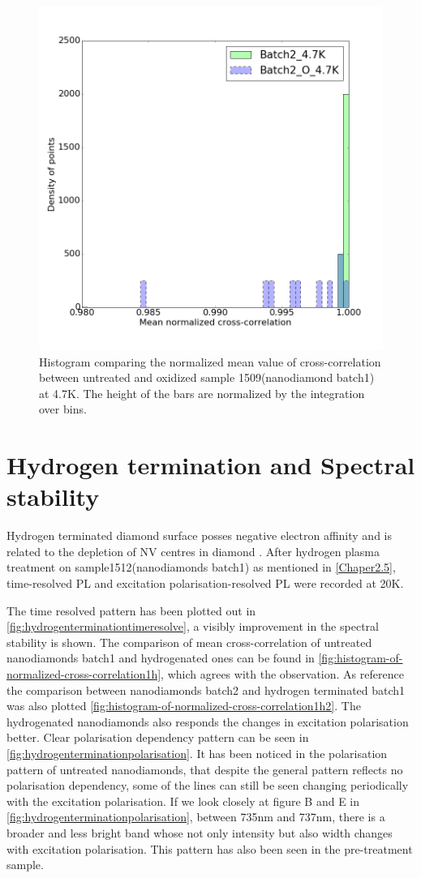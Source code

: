 \begin{figure}[h]
	\centering
	\includegraphics[width=0.7\linewidth]{"Figures/pic/Histogram of normalized cross-correlation_2_o"}
	\caption{Histogram comparing the normalized mean value of cross-correlation between untreated and oxidized sample 1509(nanodiamond batch1) at 4.7K. The height of the bars are normalized by the integration over bins. }
	\label{fig:histogram-of-normalized-cross-correlation2o}
\end{figure}

\section{Hydrogen termination and Spectral stability}

Hydrogen terminated diamond surface posses negative electron affinity \citep{maier_electron_2001,ristein_electronic_2000,diederich_electron_1998} and is related to the depletion of NV centres in diamond \citep{stacey_depletion_2012}. After hydrogen plasma treatment on sample1512(nanodiamonds batch1) as mentioned in \ref{Chaper2.5}, time-resolved PL and excitation polarisation-resolved PL were recorded at 20K.

The time resolved pattern has been plotted out in \ref{fig:hydrogenterminationtimeresolve}, a visibly improvement in the spectral stability is shown. The comparison of mean cross-correlation of untreated nanodiamonds batch1 and hydrogenated ones can be found in \ref{fig:histogram-of-normalized-cross-correlation1h}, which agrees with the observation. As reference the comparison between nanodiamonds batch2 and hydrogen terminated batch1 was also plotted \ref{fig:histogram-of-normalized-cross-correlation1h2}. The hydrogenated nanodiamonds also responds the changes in excitation polarisation better. Clear polarisation dependency pattern can be seen in \ref{fig:hydrogenterminationpolarisation}. It has been noticed in the polarisation pattern of untreated nanodiamonds, that despite the general pattern reflects no polarisation dependency, some of the lines can still be seen changing periodically with the excitation polarisation. If we look closely at figure B and E in \ref{fig:hydrogenterminationpolarisation}, between 735nm and 737nm, there is a broader and less bright band whose not only intensity but also width changes with excitation polarisation. This pattern has also been seen in the pre-treatment sample.


